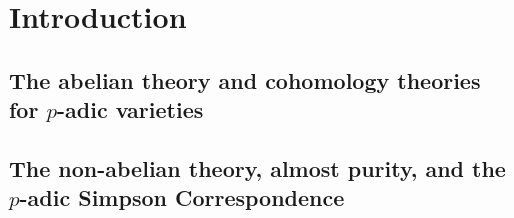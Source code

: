 \chapter{Introduction}
    \section{The abelian theory and cohomology theories for \texorpdfstring{$p$}{}-adic varieties}
    
    \section{The non-abelian theory, almost purity, and the \texorpdfstring{$p$}{}-adic Simpson Correspondence}